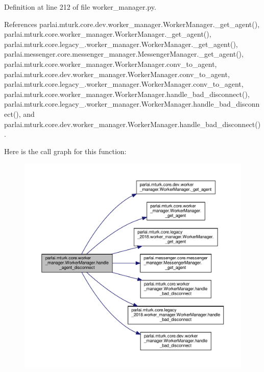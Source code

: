 Definition at line 212 of file worker\+\_\+manager.\+py.



References parlai.\+mturk.\+core.\+dev.\+worker\+\_\+manager.\+Worker\+Manager.\+\_\+get\+\_\+agent(), parlai.\+mturk.\+core.\+worker\+\_\+manager.\+Worker\+Manager.\+\_\+get\+\_\+agent(), parlai.\+mturk.\+core.\+legacy\+\_.\+worker\+\_\+manager.\+Worker\+Manager.\+\_\+get\+\_\+agent(), parlai.\+messenger.\+core.\+messenger\+\_\+manager.\+Messenger\+Manager.\+\_\+get\+\_\+agent(), parlai.\+mturk.\+core.\+worker\+\_\+manager.\+Worker\+Manager.\+conv\+\_\+to\+\_\+agent, parlai.\+mturk.\+core.\+dev.\+worker\+\_\+manager.\+Worker\+Manager.\+conv\+\_\+to\+\_\+agent, parlai.\+mturk.\+core.\+legacy\+\_.\+worker\+\_\+manager.\+Worker\+Manager.\+conv\+\_\+to\+\_\+agent, parlai.\+mturk.\+core.\+worker\+\_\+manager.\+Worker\+Manager.\+handle\+\_\+bad\+\_\+disconnect(), parlai.\+mturk.\+core.\+legacy\+\_.\+worker\+\_\+manager.\+Worker\+Manager.\+handle\+\_\+bad\+\_\+disconnect(), and parlai.\+mturk.\+core.\+dev.\+worker\+\_\+manager.\+Worker\+Manager.\+handle\+\_\+bad\+\_\+disconnect().

Here is the call graph for this function\+:
\nopagebreak
\begin{figure}[H]
\begin{center}
\leavevmode
\includegraphics[width=350pt]{classparlai_1_1mturk_1_1core_1_1worker__manager_1_1WorkerManager_a26f5469b17d425d52277f50b59e611f1_cgraph}
\end{center}
\end{figure}
\mbox{\label{classparlai_1_1mturk_1_1core_1_1worker__manager_1_1WorkerManager_ac75275d1b201b5bcbd8f23740b4e1080}} 
